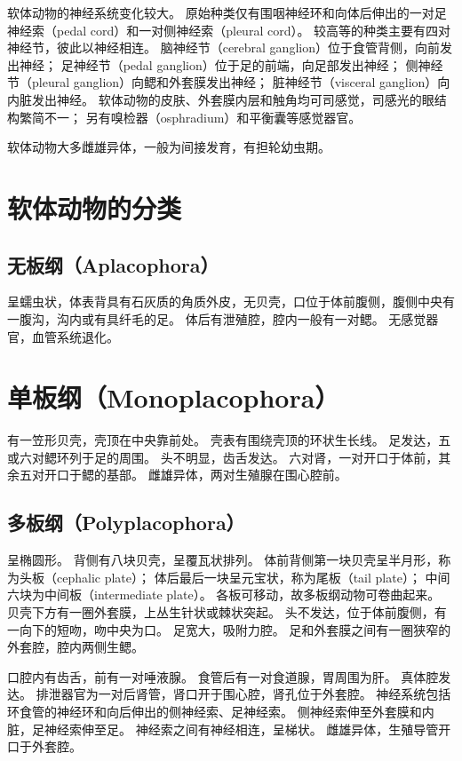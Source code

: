 \documentclass[11pt]{article}
\begin{document}
\newline

软体动物的神经系统变化较大。
原始种类仅有围咽神经环和向体后伸出的一对足神经索（pedal cord）和一对侧神经索（pleural cord）。
较高等的种类主要有四对神经节，彼此以神经相连。
脑神经节（cerebral ganglion）位于食管背侧，向前发出神经；
足神经节（pedal ganglion）位于足的前端，向足部发出神经；
侧神经节（pleural ganglion）向鳃和外套膜发出神经；
脏神经节（visceral ganglion）向内脏发出神经。
软体动物的皮肤、外套膜内层和触角均可司感觉，司感光的眼结构繁简不一；
另有嗅检器（osphradium）和平衡囊等感觉器官。

\newline

软体动物大多雌雄异体，一般为间接发育，有担轮幼虫期。
  
\section{软体动物的分类}
\subsection{无板纲（Aplacophora）}
呈蠕虫状，体表背具有石灰质的角质外皮，无贝壳，口位于体前腹侧，腹侧中央有一腹沟，沟内或有具纤毛的足。
体后有泄殖腔，腔内一般有一对鳃。
无感觉器官，血管系统退化。
  
\section{单板纲（Monoplacophora）}
有一笠形贝壳，壳顶在中央靠前处。
壳表有围绕壳顶的环状生长线。
足发达，五或六对鳃环列于足的周围。
头不明显，齿舌发达。
六对肾，一对开口于体前，其余五对开口于鳃的基部。
雌雄异体，两对生殖腺在围心腔前。

\subsection{多板纲（Polyplacophora）}
呈椭圆形。
背侧有八块贝壳，呈覆瓦状排列。
体前背侧第一块贝壳呈半月形，称为头板（cephalic plate）；
体后最后一块呈元宝状，称为尾板（tail plate）；
中间六块为中间板（intermediate plate）。
各板可移动，故多板纲动物可卷曲起来。
贝壳下方有一圈外套膜，上丛生针状或棘状突起。
头不发达，位于体前腹侧，有一向下的短吻，吻中央为口。
足宽大，吸附力腔。
足和外套膜之间有一圈狭窄的外套腔，腔内两侧生鳃。

\newline
  
口腔内有齿舌，前有一对唾液腺。
食管后有一对食道腺，胃周围为肝。
真体腔发达。
排泄器官为一对后肾管，肾口开于围心腔，肾孔位于外套腔。
神经系统包括环食管的神经环和向后伸出的侧神经索、足神经索。
侧神经索伸至外套膜和内脏，足神经索伸至足。
神经索之间有神经相连，呈梯状。
雌雄异体，生殖导管开口于外套腔。
  
\end{document}
